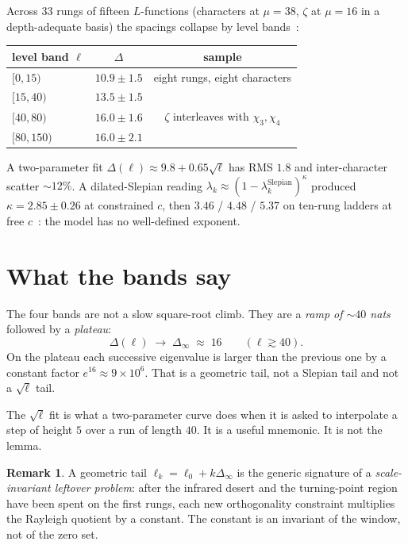 \documentclass[10pt]{article}
\theoremstyle{definition}
\newtheorem*{remark}{Remark}
\begin{document}
Across $33$ rungs of fifteen $L$-functions (characters at $\mu=38$,
$\zeta$ at $\mu=16$ in a depth-adequate basis) the spacings collapse by
level bands~\cite{Depth,LabNB}:
\begin{center}\small
\begin{tabular}{lcc}
\toprule
level band $\ell$ & $\Delta$ & sample \\
\midrule
$[0,15)$  & $10.9\pm1.5$ & eight rungs, eight characters \\
$[15,40)$ & $13.5\pm1.5$ & \\
$[40,80)$ & $16.0\pm1.6$ & $\zeta$ interleaves with $\chi_3,\chi_4$ \\
$[80,150)$& $16.0\pm2.1$ & \\
\bottomrule
\end{tabular}
\end{center}
A two-parameter fit $\Delta(\ell)\approx9.8+0.65\sqrt{\ell}$ has RMS
$1.8$ and inter-character scatter $\sim12\%$. A dilated-Slepian reading
$\lambda_k\approx(1-\lambda_k^{\mathrm{Slepian}})^\kappa$ produced
$\kappa=2.85\pm0.26$ at constrained $c$, then $3.46$ / $4.48$ / $5.37$
on ten-rung ladders at free $c$~\cite{LabNB}: the model has no
well-defined exponent.

\section{What the bands say}

The four bands are not a slow square-root climb. They are a
\emph{ramp of $\sim40$ nats} followed by a \emph{plateau}:
\[
\Delta(\ell) \;\longrightarrow\; \Delta_\infty \;\approx\; 16
\qquad(\ell\gtrsim40).
\]
On the plateau each successive eigenvalue is larger than the previous
one by a constant factor $e^{16}\approx9\times10^6$. That is a geometric
tail, not a Slepian tail and not a $\sqrt{\ell}$ tail.

The $\sqrt{\ell}$ fit is what a two-parameter curve does when it is
asked to interpolate a step of height $5$ over a run of length $40$.
It is a useful mnemonic. It is not the lemma.

\begin{remark}
A geometric tail $\ell_k=\ell_0+k\Delta_\infty$ is the generic
signature of a \emph{scale-invariant leftover problem}: after the
infrared desert and the turning-point region have been spent on the
first rungs, each new orthogonality constraint multiplies the Rayleigh
quotient by a constant. The constant is an invariant of the window,
not of the zero set.
\end{remark}
\end{document}
